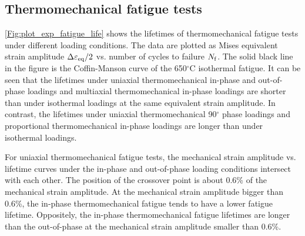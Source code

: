 \subsection{Thermomechanical fatigue tests}
\noindent
\ref{Fig:plot_exp_fatigue_life} shows the lifetimes of thermomechanical fatigue tests under different loading conditions. The data are plotted as Mises equivalent strain amplitude $\Delta\varepsilon_{\rm eq}/2$ vs. number of cycles to failure $N_{\rm f}$. The solid black line in the figure is the Coffin-Manson curve of the 650$^\circ$C isothermal fatigue. It can be seen that the lifetimes under uniaxial thermomechanical in-phase and out-of-phase loadings and multiaxial thermomechanical in-phase loadings are shorter than under isothermal loadings at the same equivalent strain amplitude.
In contrast, the lifetimes under uniaxial thermomechanical 90$^\circ$ phase loadings and proportional thermomechanical in-phase loadings are longer than under isothermal loadings.

For uniaxial thermomechanical fatigue tests, the mechanical strain amplitude vs. lifetime curves under the in-phase and out-of-phase loading conditions intersect with each other. The position of the crossover point is about 0.6\% of the mechanical strain amplitude.
At the mechanical strain amplitude bigger than 0.6\%, the in-phase thermomechanical fatigue tends to have a lower fatigue lifetime. Oppositely, the in-phase thermomechanical fatigue lifetimes are longer than the out-of-phase at the mechanical strain amplitude smaller than 0.6\%.



